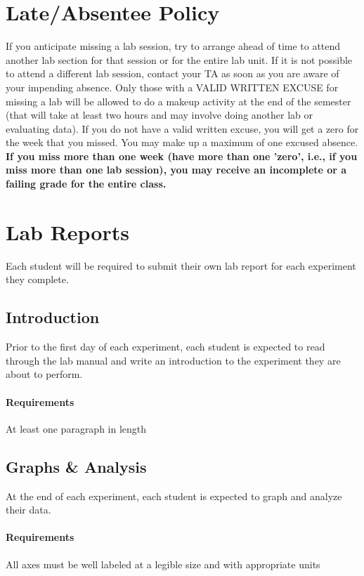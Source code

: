\section*{Late/Absentee Policy}
If you anticipate missing a lab session, try to arrange ahead of time to attend another lab section for that session or for the entire lab unit.
If it is not possible to attend a different lab session, contact your TA as soon as you are aware of your impending absence.
Only those with a VALID WRITTEN EXCUSE for missing a lab will be allowed to do a makeup activity at the end of the semester (that will take at least two hours and may involve doing another lab or evaluating data).
If you do not have a valid written excuse, you will get a zero for the week that you missed.
You may make up a maximum of one excused absence.
\textbf{If you miss more than one week (have more than one 'zero', i.e., if you miss more than one lab session), you may receive an incomplete or a failing grade for the entire class.}

\section*{Lab Reports}
Each student will be required to submit their own lab report for each experiment they complete.  

\subsection*{Introduction}
Prior to the first day of each experiment, each student is expected to read through the lab manual and write an introduction to the experiment they are about to perform.
\paragraph*{Requirements}
\begin{list}{-}{}
\item At least one paragraph in length
\end{list}

\subsection*{Graphs \& Analysis}
At the end of each experiment, each student is expected to graph and analyze their data.
\paragraph*{Requirements}
\begin{list}{-}{}
\item All axes must be well labeled at a legible size and with appropriate units 
\end{list}  


